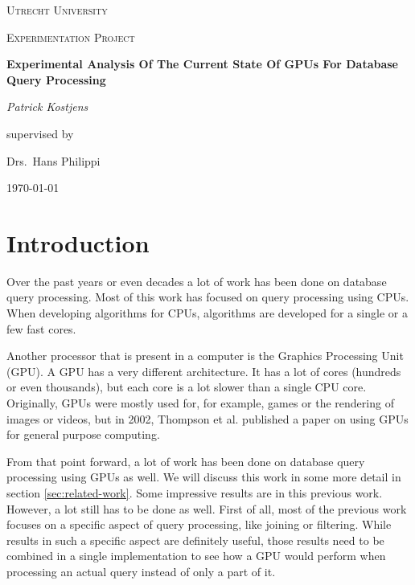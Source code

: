 \documentclass[a4paper,titlepage]{article}
\begin{document}
\begin{titlepage}
	\centering
	{\scshape\LARGE Utrecht University \par}
	\vspace{1cm}
	{\scshape\Large Experimentation Project \par}
	\vspace{1.5cm}
	{\huge\bfseries Experimental Analysis Of The Current State Of GPUs For Database Query Processing\par}
	\vspace{2cm}
	{\Large\itshape Patrick Kostjens\par}
	\vfill
	supervised by\par
	Drs.~Hans Philippi

	\vfill

	{\large \today\par}
\end{titlepage}

\begin{abstract}

\textbf{Keywords:} query processing, graphics processing unit, relational database, parallel processing, CUDA
\end{abstract}

\section{Introduction}
Over the past years or even decades a lot of work has been done on database query processing. Most of this work has focused on query processing using CPUs. When developing algorithms for CPUs, algorithms are developed for a single or a few fast cores. %

Another processor that is present in a computer is the Graphics Processing Unit (GPU). A GPU has a very different architecture. It has a lot of cores (hundreds or even thousands), but each core is a lot slower than a single CPU core. Originally, GPUs were mostly used for, for example, games or the rendering of images or videos, but in 2002, Thompson et al. \cite{thompson2002} published a paper on using GPUs for general purpose computing.

From that point forward, a lot of work has been done on database query processing using GPUs as well. We will discuss this work in some more detail in section \ref{sec:related-work}. Some impressive results are in this previous work. However, a lot still has to be done as well. First of all, most of the previous work focuses on a specific aspect of query processing, like joining or filtering. While results in such a specific aspect are definitely useful, those results need to be combined in a single implementation to see how a GPU would perform when processing an actual query instead of only a part of it.
\end{document}
